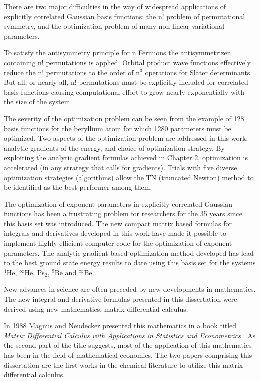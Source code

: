 \documentclass[12pt,thmsa,suthesis,verbatim]{report}
\begin{document}
There are two major difficulties in the way of widespread applications of
explicitly correlated Gaussian basis functions: the n! problem of
permutational symmetry, and the optimization problem of many non-linear
variational parameters.

To satisfy the antisymmetry principle for n Fermions the antisymmetrizer
containing n! permutations is applied. Orbital product wave functions
effectively reduce the n! permutations to the order of n$^3$ operations for
Slater determinants. But all, or nearly all, n! permutations must be
explicitly included for correlated basis functions causing computational
effort to grow nearly exponentially with the size of the system.

The severity of the optimization problem can be seen from the example of 128
basis functions for the beryllium atom for which 1280 parameters must be
optimized. Two aspects of the optimization problem are addressed in this
work: analytic gradients of the energy, and choice of optimization strategy.
By exploiting the analytic gradient formulas achieved in Chapter 2,
optimization is accelerated (in any strategy that calls for gradients).
Trials with five diverse optimization strategies (algorithms) allow the TN
(truncated Newton) method to be identified as the best performer among them.

The optimization of exponent parameters in explicitly correlated Gaussian
functions has been a frustrating problem for researchers for the 35 years
since this basis set was introduced. The new compact matrix based formulas
for integrals and derivatives developed in this work have made it possible
to implement highly efficient computer code for the optimization of exponent
parameters. The analytic gradient based optimization method developed has
lead to the best ground state energy results to date using this basis set
for the systems $^4$He, $^\infty $He, Ps$_2$, $^9$Be and $^\infty $Be.

New advances in science are often preceded by new developments in
mathematics. The new integral and derivative formulas presented in this
dissertation were derived using new mathematics, matrix differential
calculus.

In 1988 Magnus and Neudecker presented this mathematics in a book titled 
\emph{Matrix Differential Calculus with Applications in Statistics and
Econometrics }\cite{MagNeud88}. As the second part of the title suggests,
most of the application of this mathematics has been in the field of
mathematical economics. The two papers comprising this dissertation are the
first works in the chemical literature to utilize this matrix differential
calculus.
\end{document}
